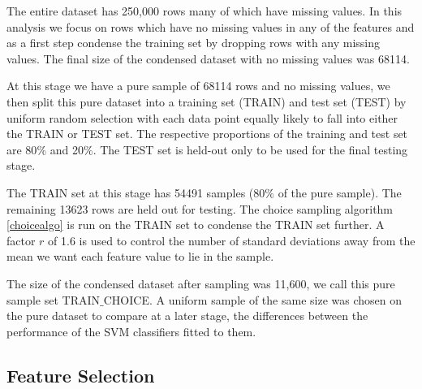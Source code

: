 \documentclass[final,3p,times,twocolumn]{elsarticle}
\begin{document}
The entire dataset has 250,000 rows many of which have missing values. In this analysis we focus on rows which have no missing values in any of the features and as a first step condense the training set by dropping rows with any missing values. The final size of the condensed dataset with no missing values was 68114.

At this stage we have a pure sample of 68114 rows and no missing values, we then split this pure dataset into a training set (TRAIN) and test set (TEST) by uniform random selection with each data point equally likely to fall into either the TRAIN or TEST set. The respective proportions of the training and test set are 80$\%$ and 20$\%$. The TEST set is held-out only to be used for the final testing stage. 

The TRAIN set at this stage has 54491 samples (80$\%$ of the pure sample). The remaining 13623 rows are held out for testing. The choice sampling algorithm \ref{choicealgo} is run on the TRAIN set to condense the TRAIN set further. A factor $r$ of 1.6 is used to control the number of standard deviations away from the mean we want each feature value to lie in the sample. 

The size of the condensed dataset after sampling was 11,600, we call this pure sample set TRAIN$\_$CHOICE. A uniform sample of the same size was chosen on the pure dataset to compare at a later stage, the differences between the performance of the SVM classifiers fitted to them. 

\subsection{Feature Selection}
\end{document}
